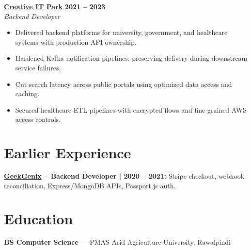 \documentclass[10pt,letterpaper]{article}
\begin{document}
\vspace{4pt}

\vfill

\textbf{\href{https://creativeitpark.org/}{Creative IT Park}} \hfill \textbf{2021 -- 2023}\\
\textit{Backend Developer}

\begin{itemize}
  \item Delivered backend platforms for university, government, and healthcare systems with production API ownership.
  \item Hardened Kafka notification pipelines, preserving delivery during downstream service failures.
  \item Cut search latency across public portals using optimized data access and caching.
  \item Secured healthcare ETL pipelines with encrypted flows and fine-grained AWS access controls.
\end{itemize}

\vspace{4pt}

\vfill

\section*{Earlier Experience}
\textbf{\href{https://www.geekgenix.com/}{GeekGenix} -- Backend Developer | 2020 -- 2021:}
Stripe checkout, webhook reconciliation, Express/MongoDB APIs, Passport.js auth.

\vfill

\section*{Education}
\textbf{BS Computer Science} --- PMAS Arid Agriculture University, Rawalpindi
\end{document}
